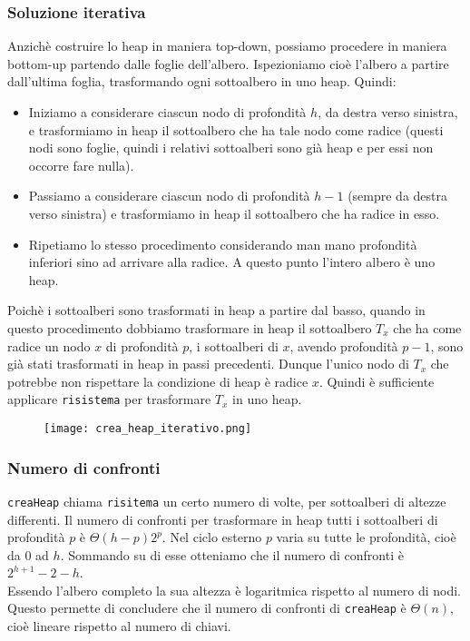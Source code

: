 \subsubsection*{Soluzione iterativa}
Anzichè costruire lo heap in maniera top-down, possiamo procedere in maniera bottom-up partendo
dalle foglie dell'albero. Ispezioniamo cioè l'albero a partire dall'ultima foglia, trasformando ogni sottoalbero
in uno heap. Quindi:
\begin{itemize}
    \item Iniziamo a considerare ciascun nodo di profondità $h$, da destra verso sinistra,
    e trasformiamo in heap il sottoalbero che ha tale nodo come radice (questi nodi sono foglie, quindi 
    i relativi sottoalberi sono già heap e per essi non occorre fare nulla).
    \item Passiamo a considerare ciascun nodo di profondità $h - 1$ (sempre da destra verso sinistra)
    e trasformiamo in heap il sottoalbero che ha radice in esso.
    \item Ripetiamo lo stesso procedimento considerando man mano profondità inferiori
    sino ad arrivare alla radice. A questo punto l'intero albero è uno heap.
\end{itemize}

\noindent Poichè i sottoalberi sono trasformati in heap a partire dal basso, quando in questo procedimento dobbiamo
trasformare in heap il sottoalbero $T_{x}$ che ha come radice un nodo $x$ di profondità $p$, i sottoalberi di $x$, avendo profondità
$p-1$, sono già stati trasformati in heap in passi precedenti. Dunque l'unico nodo di $T_{x}$ che potrebbe non
rispettare la condizione di heap è radice $x$. Quindi è sufficiente applicare \texttt{risistema}
per trasformare $T_{x}$ in uno heap.
\begin{figure}[h]
    \texttt{[image: crea\_heap\_iterativo.png]}
\end{figure}

\subsubsection*{Numero di confronti}
\texttt{creaHeap} chiama \texttt{risitema} un certo numero di volte, per sottoalberi di altezze differenti.
Il numero di confronti per trasformare in heap tutti i sottoalberi di profondità $p$ è 
$\Theta(h-p)2^p$. Nel ciclo esterno $p$ varia su tutte le profondità, cioè da 0 ad $h$.
Sommando su di esse otteniamo che il numero di confronti è $2^{h+1} - 2 - h$.\\
Essendo l'albero completo la sua altezza è logaritmica rispetto al numero di nodi. Questo 
permette di concludere che il numero di confronti di \texttt{creaHeap} è $\Theta(n)$, cioè lineare 
rispetto al numero di chiavi.

